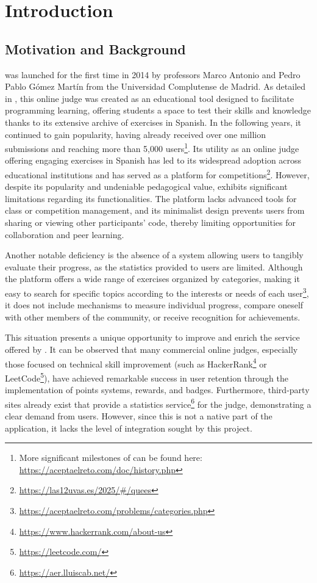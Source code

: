 \chapter{Introduction}
\label{cap:introduction}

\section{Motivation and Background} 

\aer was launched for the first time in 2014 by professors Marco Antonio and Pedro Pablo Gómez Martín from the Universidad Complutense de Madrid. As detailed in \cite{Pedro_Pablo_Gomez_Martin_Marco_Antonio_Gomez_Martin_2017}, this online judge was created as an educational tool designed to facilitate programming learning, offering students a space to test their skills and knowledge thanks to its extensive archive of exercises in Spanish. In the following years, it continued to gain popularity, having already received over one million submissions and reaching more than 5,000 users\footnote{More significant milestones of \aer can be found here: \url{https://aceptaelreto.com/doc/history.php}}. Its utility as an online judge offering engaging exercises in Spanish has led to its widespread adoption across educational institutions and has served as a platform for competitions\footnote{\url{https://las12uvas.es/2025/\#/quees}}. However, despite its popularity and undeniable pedagogical value, \aer exhibits significant limitations regarding its functionalities. The platform lacks advanced tools for class or competition management, and its minimalist design prevents users from sharing or viewing other participants' code, thereby limiting opportunities for collaboration and peer learning.

Another notable deficiency is the absence of a system allowing users to tangibly evaluate their progress, as the statistics provided to users are limited. Although the platform offers a wide range of exercises organized by categories, making it easy to search for specific topics according to the interests or needs of each user\footnote{\url{https://aceptaelreto.com/problems/categories.php}}, it does not include mechanisms to measure individual progress, compare oneself with other members of the community, or receive recognition for achievements.

This situation presents a unique opportunity to improve and enrich the service offered by \aer. It can be observed that many commercial online judges, especially those focused on technical skill improvement (such as HackerRank\footnote{\url{https://www.hackerrank.com/about-us}} or LeetCode\footnote{\url{https://leetcode.com/}}), have achieved remarkable success in user retention through the implementation of points systems, rewards, and badges. Furthermore, third-party sites already exist that provide a statistics service\footnote{\url{https://aer.lluiscab.net/}} for the judge, demonstrating a clear demand from users. However, since this is not a native part of the application, it lacks the level of integration sought by this project.

